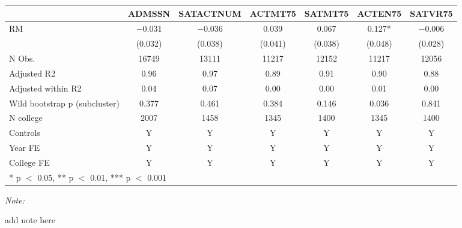 \begin{table}
\centering
\begin{threeparttable}
\begin{tabular}[t]{lcccccc}
\toprule
  & ADMSSN & SATACTNUM & ACTMT75 & SATMT75 & ACTEN75 & SATVR75\\
\midrule
RM & \num{-0.031} & \num{-0.036} & \num{0.039} & \num{0.067} & \num{0.127}* & \num{-0.006}\\
 & (\num{0.032}) & (\num{0.038}) & (\num{0.041}) & (\num{0.038}) & (\num{0.048}) & (\num{0.028})\\
\midrule
N Obs. & \num{16749} & \num{13111} & \num{11217} & \num{12152} & \num{11217} & \num{12056}\\
Adjusted R2 & \num{0.96} & \num{0.97} & \num{0.89} & \num{0.91} & \num{0.90} & \num{0.88}\\
Adjusted within R2 & \num{0.04} & \num{0.07} & \num{0.00} & \num{0.00} & \num{0.01} & \num{0.00}\\
Wild bootstrap p (subcluster) & 0.377 & 0.461 & 0.384 & 0.146 & 0.036 & 0.841\\
N college & 2007 & 1458 & 1345 & 1400 & 1345 & 1400\\
Controls & Y & Y & Y & Y & Y & Y\\
Year FE & Y & Y & Y & Y & Y & Y\\
College FE & Y & Y & Y & Y & Y & Y\\
\bottomrule
\multicolumn{7}{l}{\rule{0pt}{1em}* p $<$ 0.05, ** p $<$ 0.01, *** p $<$ 0.001}\\
\end{tabular}
\begin{tablenotes}
\item \textit{Note: } 
\item add note here
\end{tablenotes}
\end{threeparttable}
\end{table}
